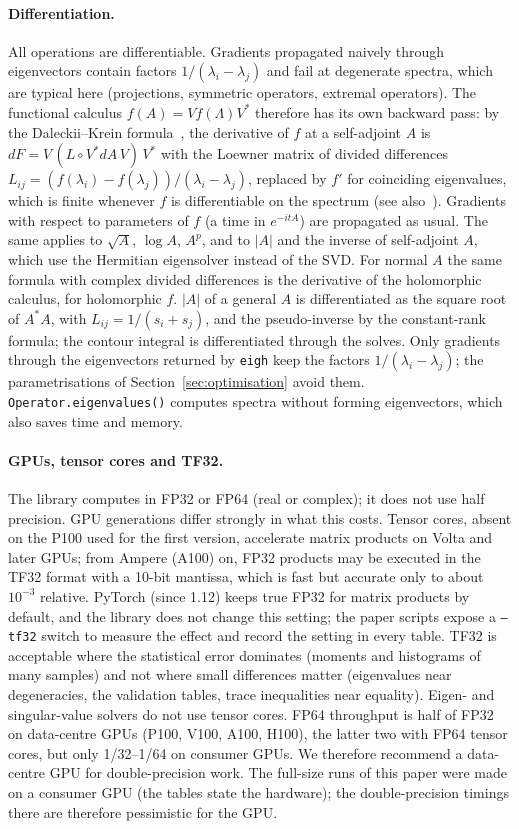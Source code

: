 \documentclass[11pt]{article}
\begin{document}
\paragraph{Differentiation.} All operations are differentiable. Gradients propagated naively through
eigenvectors contain factors $1/(\lambda_i-\lambda_j)$ and fail at degenerate spectra, which are typical here
(projections, symmetric operators, extremal operators). The functional calculus $f(A)=Vf(\Lambda)V^*$ therefore
has its own backward pass: by the Daleckii--Krein formula~\cite{daleckii1965,bhatia1997}, the derivative of $f$ at
a self-adjoint $A$ is $dF=V\,(L\circ V^*dA\,V)\,V^*$ with the Loewner matrix of divided differences
$L_{ij}=(f(\lambda_i)-f(\lambda_j))/(\lambda_i-\lambda_j)$, replaced by $f'$ for coinciding eigenvalues, which is
finite whenever $f$ is differentiable on the spectrum (see also~\cite{kasim2020}). Gradients with respect to
parameters of $f$ (a time in $e^{-itA}$) are propagated as usual. The same applies to $\sqrt A$, $\log A$, $A^p$,
and to $|A|$ and the inverse of self-adjoint $A$, which use the Hermitian eigensolver instead of the SVD. For normal $A$ the same formula with complex divided differences is the derivative of the
holomorphic calculus, for holomorphic $f$. $|A|$ of a general $A$ is differentiated as the square root of $A^*A$,
with $L_{ij}=1/(s_i+s_j)$, and the pseudo-inverse by the constant-rank formula; the contour integral is
differentiated through the solves. Only gradients through the eigenvectors returned by \texttt{eigh} keep the
factors $1/(\lambda_i-\lambda_j)$; the parametrisations of Section~\ref{sec:optimisation} avoid them. \texttt{Operator.eigenvalues()} computes spectra without forming eigenvectors, which also saves time and
memory.

\paragraph{GPUs, tensor cores and TF32.} The library computes in FP32 or FP64 (real or complex); it does not use
half precision. GPU generations differ strongly in what this costs. Tensor cores, absent on the P100 used for the
first version, accelerate matrix products on Volta and later GPUs; from Ampere (A100) on, FP32 products may be
executed in the TF32 format with a 10-bit mantissa, which is fast but accurate only to about $10^{-3}$ relative.
PyTorch (since 1.12) keeps true FP32 for matrix products by default, and the library does not change this setting;
the paper scripts expose a \texttt{--tf32} switch to measure the effect and record the setting in every table.
TF32 is acceptable where the statistical error dominates (moments and histograms of many samples) and not where
small differences matter (eigenvalues near degeneracies, the validation tables, trace inequalities near equality). Eigen- and singular-value solvers do not use
tensor cores. FP64 throughput is half of FP32 on data-centre GPUs (P100, V100, A100, H100), the latter two with FP64
tensor cores, but only 1/32--1/64 on consumer GPUs. We therefore recommend a data-centre GPU for double-precision
work. The full-size runs of this paper were made on a consumer GPU (the tables state the hardware); the
double-precision timings there are therefore pessimistic for the GPU.
\end{document}
